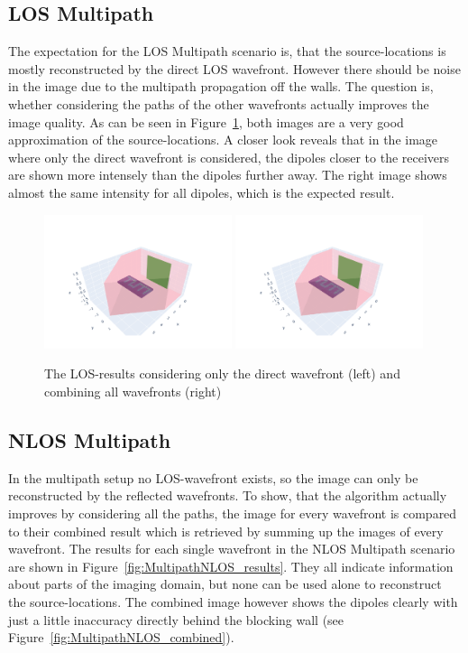 \subsection{LOS Multipath}
The expectation for the LOS Multipath scenario is, that the source-locations is mostly reconstructed by the direct LOS wavefront.
However there should be noise in the image due to the multipath propagation off the walls.
The question is, whether considering the paths of the other wavefronts actually improves the image quality.
As can be seen in Figure~\ref{fig:MultipathLOS}, both images are a very good approximation of the source-locations.
A closer look reveals that in the image where only the direct wavefront is considered, the dipoles closer to the receivers are shown more intensely than the dipoles further away.
The right image shows almost the same intensity for all dipoles, which is the expected result.

\begin{figure}[h]
    \centering
    \includegraphics[width=0.49\textwidth]{figures/result_multipath_los_direct.pdf}
    \includegraphics[width=0.49\textwidth]{figures/result_multipath_los_combined.pdf}
    \caption{The LOS-results considering only the direct wavefront (left) and combining all wavefronts (right)}\label{fig:MultipathLOS}
\end{figure}


\subsection{NLOS Multipath}
In the multipath setup no LOS-wavefront exists, so the image can only be reconstructed by the reflected wavefronts.
To show, that the algorithm actually improves by considering all the paths, the image for every wavefront is compared to their combined result which is retrieved by summing up the images of every wavefront.
The results for each single wavefront in the NLOS Multipath scenario are shown in Figure~\ref{fig:MultipathNLOS_results}.
They all indicate information about parts of the imaging domain, but none can be used alone to reconstruct the source-locations.
The combined image however shows the dipoles clearly with just a little inaccuracy directly behind the blocking wall (see Figure~\ref{fig:MultipathNLOS_combined}).

